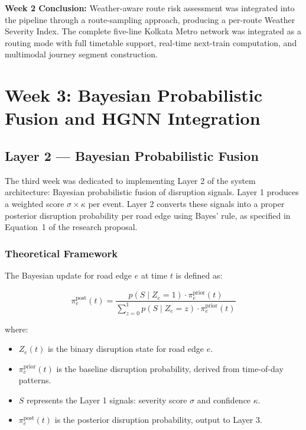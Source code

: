 \documentclass[12pt, a4paper]{report}
\begin{document}
\textbf{Week 2 Conclusion:} Weather-aware route risk assessment was integrated into the pipeline through a route-sampling approach, producing a per-route Weather Severity Index. The complete five-line Kolkata Metro network was integrated as a routing mode with full timetable support, real-time next-train computation, and multimodal journey segment construction.

\clearpage

\chapter{Week 3: Bayesian Probabilistic Fusion and HGNN Integration}
\label{chap:week3}

\section{Layer 2 — Bayesian Probabilistic Fusion}

The third week was dedicated to implementing Layer 2 of the system architecture: Bayesian probabilistic fusion of disruption signals. Layer 1 produces a weighted score $\sigma \times \kappa$ per event. Layer 2 converts these signals into a proper posterior disruption probability per road edge using Bayes' rule, as specified in Equation~1 of the research proposal.

\subsection{Theoretical Framework}

The Bayesian update for road edge $e$ at time $t$ is defined as:

\[
\pi_e^{\text{post}}(t) = \frac{p(S \mid Z_e=1) \cdot \pi_e^{\text{prior}}(t)}
                              {\sum_{z=0}^{1} p(S \mid Z_e=z) \cdot \pi_e^{\text{prior}}(t)}
\]

where:
\begin{itemize}
    \item $Z_e(t)$ is the binary disruption state for road edge $e$.
    \item $\pi_e^{\text{prior}}(t)$ is the baseline disruption probability, derived from time-of-day patterns.
    \item $S$ represents the Layer 1 signals: severity score $\sigma$ and confidence $\kappa$.
    \item $\pi_e^{\text{post}}(t)$ is the posterior disruption probability, output to Layer 3.
\end{itemize}
\end{document}
